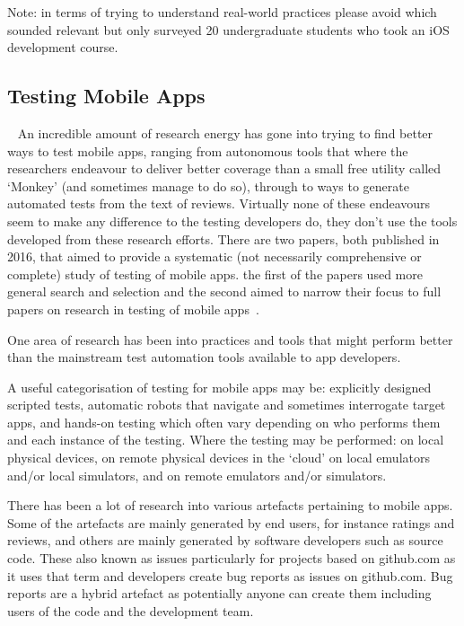 Note: in terms of trying to understand real-world practices please avoid \textcite{santos2016_investigating_the_adoption_of_agile_practices_by_20_undergrad_students_in_mobile_app_devt} which sounded relevant but only surveyed 20 undergraduate students who took an iOS development course. 


\subsection{Testing Mobile Apps}~\label{rw-testing-mobile-apps-topic}
An incredible amount of research energy has gone into trying to find better ways to test mobile apps, ranging from autonomous tools that where the researchers endeavour to deliver better coverage than a small free utility called `Monkey' (and sometimes manage to do so), through to ways to generate automated tests from the text of reviews. Virtually none of these endeavours seem to make any difference to the testing developers do, they don't use the tools developed from these research efforts. There are two papers, both published in 2016, that aimed to provide a systematic (not necessarily comprehensive or complete) study of testing of mobile apps. the first of the papers used more general search and selection   and the second aimed to narrow their focus to full papers on research in testing of mobile apps~. 

One area of research has been into practices and tools that might perform better than the mainstream test automation tools available to app developers.

A useful categorisation of testing for mobile apps may be: 
explicitly designed scripted tests, 
automatic robots that navigate and sometimes interrogate target apps, and 
hands-on testing which often vary depending on who performs them and each instance of the testing. 
Where the testing may be performed:
on local physical devices,
on remote physical devices in the `cloud'
on local emulators and/or local simulators, and
on remote emulators and/or simulators.

There has been a lot of research into various artefacts pertaining to mobile apps. Some of the artefacts are mainly generated by end users, for instance ratings and reviews, and others are mainly generated by software developers such as source code. These also known as issues particularly for projects based on github.com as it uses that term and developers create bug reports as issues on github.com. Bug reports are a hybrid artefact as potentially anyone can create them including users of the code and the development team. 

